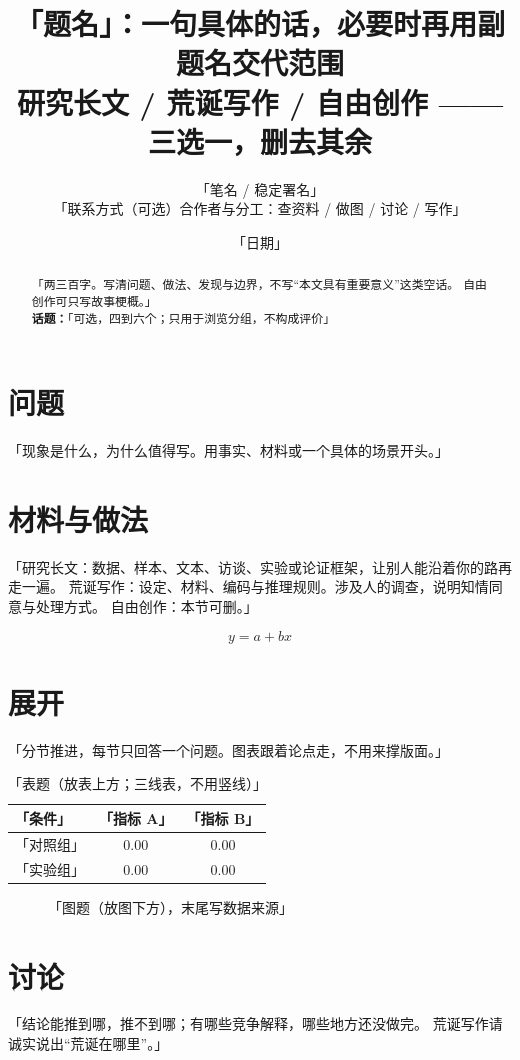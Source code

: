 \documentclass[12pt,a4paper]{article}
\title{\textbf{「题名」：一句具体的话，必要时再用副题名交代范围}\\
{\large 研究长文 / 荒诞写作 / 自由创作 —— 三选一，删去其余}}
\author{「笔名 / 稳定署名」\\
{\small 「联系方式（可选）\quad 合作者与分工：查资料 / 做图 / 讨论 / 写作」}}
\date{「日期」}
\begin{document}
\maketitle

\begin{abstract}
「两三百字。写清问题、做法、发现与边界，不写“本文具有重要意义”这类空话。
自由创作可只写故事梗概。」\\[0.8em]
\textbf{话题：}「可选，四到六个；只用于浏览分组，不构成评价」
\end{abstract}

\section{问题}
「现象是什么，为什么值得写。用事实、材料或一个具体的场景开头。」

\section{材料与做法}
「研究长文：数据、样本、文本、访谈、实验或论证框架，让别人能沿着你的路再走一遍。
荒诞写作：设定、材料、编码与推理规则。涉及人的调查，说明知情同意与处理方式。
自由创作：本节可删。」

\begin{equation}
y = a + bx
\label{eq:demo}
\end{equation}

\section{展开}
「分节推进，每节只回答一个问题。图表跟着论点走，不用来撑版面。」

\begin{table}[htbp]
\centering
\caption{「表题（放表上方；三线表，不用竖线）」}
\label{tab:demo}
\begin{tabular}{lcc}
\toprule
「条件」 & 「指标 A」 & 「指标 B」 \\
\midrule
「对照组」 & 0.00 & 0.00 \\
「实验组」 & 0.00 & 0.00 \\
\bottomrule
\end{tabular}
\end{table}

\begin{figure}[htbp]
\centering
\caption{「图题（放图下方），末尾写数据来源」}
\label{fig:demo}
\end{figure}

\section{讨论}
「结论能推到哪，推不到哪；有哪些竞争解释，哪些地方还没做完。
荒诞写作请诚实说出“荒诞在哪里”。」
\end{document}
